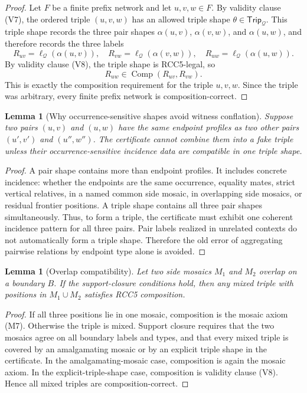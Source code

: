 \documentclass[11pt]{article}
\newtheorem{lemma}[theorem]{Lemma}
\newcommand{\comp}{\operatorname{Comp}}
\newcommand{\Q}{\mathcal Q}
\newcommand{\Trip}{\mathsf{Trip}}
\begin{document}
\begin{proof}
Let $F$ be a finite prefix network and let $u,v,w\in F$.  By validity clause (V7), the ordered triple $(u,v,w)$ has an allowed triple shape $\theta\in\Trip_\Q$.  This triple shape records the three pair shapes $\alpha(u,v)$, $\alpha(v,w)$, and $\alpha(u,w)$, and therefore records the three labels
\[
 R_{uv}=\ell_\Q(\alpha(u,v)),\quad
 R_{vw}=\ell_\Q(\alpha(v,w)),\quad
 R_{uw}=\ell_\Q(\alpha(u,w)).
\]
By validity clause (V8), the triple shape is RCC5-legal, so
\[
 R_{uw}\in\comp(R_{uv},R_{vw}).
\]
This is exactly the composition requirement for the triple $u,v,w$.  Since the triple was arbitrary, every finite prefix network is composition-correct.
\end{proof}

\begin{lemma}[Why occurrence-sensitive shapes avoid witness conflation]
Suppose two pairs $(u,v)$ and $(u,w)$ have the same endpoint profiles as two other pairs $(u',v')$ and $(u'',w'')$.  The certificate cannot combine them into a fake triple unless their occurrence-sensitive incidence data are compatible in one triple shape.
\end{lemma}

\begin{proof}
A pair shape contains more than endpoint profiles.  It includes concrete incidence: whether the endpoints are the same occurrence, equality mates, strict vertical relatives, in a named common side mosaic, in overlapping side mosaics, or residual frontier positions.  A triple shape contains all three pair shapes simultaneously.  Thus, to form a triple, the certificate must exhibit one coherent incidence pattern for all three pairs.  Pair labels realized in unrelated contexts do not automatically form a triple shape.  Therefore the old error of aggregating pairwise relations by endpoint type alone is avoided.
\end{proof}

\begin{lemma}[Overlap compatibility]
Let two side mosaics $M_1$ and $M_2$ overlap on a boundary $B$.  If the support-closure conditions hold, then any mixed triple with positions in $M_1\cup M_2$ satisfies RCC5 composition.
\end{lemma}

\begin{proof}
If all three positions lie in one mosaic, composition is the mosaic axiom (M7).  Otherwise the triple is mixed.  Support closure requires that the two mosaics agree on all boundary labels and types, and that every mixed triple is covered by an amalgamating mosaic or by an explicit triple shape in the certificate.  In the amalgamating-mosaic case, composition is again the mosaic axiom.  In the explicit-triple-shape case, composition is validity clause (V8).  Hence all mixed triples are composition-correct.
\end{proof}
\end{document}
